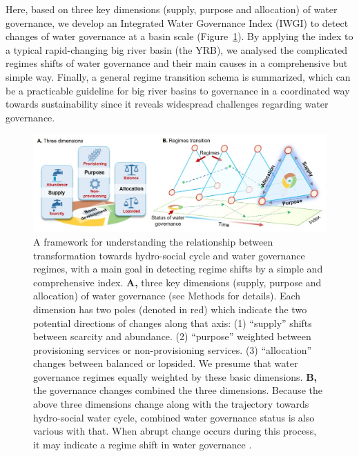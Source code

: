 \documentclass[9pt, twocolumn, twoside, lineno]{pnas-new}
\begin{document}
\label{introduction-section-3}
Here, based on three key dimensions (supply, purpose and allocation) of water governance, we develop an Integrated Water Governance Index (IWGI) to detect changes of water governance at a basin scale (Figure~\ref{fig:framework}).
By applying the index to a typical rapid-changing big river basin (the YRB), we analysed the complicated regimes shifts of water governance and their main causes in a comprehensive but simple way.
Finally, a general regime transition schema is summarized, which can be a practicable guideline for big river basins to governance in a coordinated way towards sustainability since it reveals widespread challenges regarding water governance.


\begin{figure}%
	\centering
	\includegraphics[width=0.8\linewidth]{../../figures/main/framework.jpg}
	\caption{
		A framework for understanding the relationship between transformation towards hydro-social cycle and water governance regimes, with a main goal in detecting regime shifts by a simple and comprehensive index.
		\textbf{A,} three key dimensions (supply, purpose and allocation) of water governance (see Methods for details). Each dimension has two poles (denoted in red) which indicate the two potential directions of changes along that axis: (1) ``supply'' shifts between scarcity and abundance. (2) ``purpose'' weighted between provisioning services or non-provisioning services. (3) ``allocation'' changes between balanced or lopsided. We presume that water governance regimes equally weighted by these basic dimensions. 
		\textbf{B,} the governance changes combined the three dimensions. Because the above three dimensions change along with the trajectory towards hydro-social water cycle, combined water governance status is also various with that. When abrupt change occurs during this process, it may indicate a regime shift in water governance
		\cite{steffen2018,abbott2019,levia2020}.
	}
	\label{fig:framework}
\end{figure}
\end{document}
